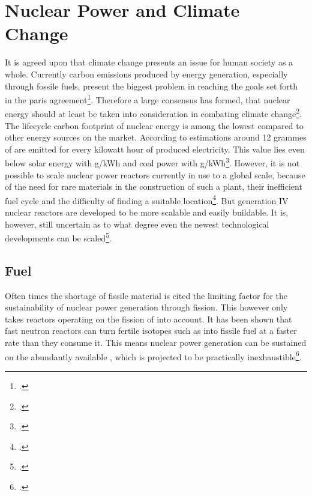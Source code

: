 \chapter{Nuclear Power and Climate Change}
It is agreed upon that climate change presents an issue for human society as a whole. Currently
carbon emissions produced by energy generation, especially through fossile fuels,
present the biggest problem in reaching the goals set forth in the paris agreement\footcite{paris}.
Therefore a large consensus has formed, that nuclear energy should at least be taken into consideration
in combating climate change\footcite{nucandclim}.
The lifecycle carbon footprint of nuclear energy is among the lowest compared to other energy
sources on the market. According to estimations around 12 grammes of  are emitted for
every kilowatt hour of produced electricity. This value lies even below solar energy with \unit[40]{g/kWh}
and coal power with \unit[820]{g/kWh}\footcite{ipcc}. However, it is not possible to scale
nuclear power reactors currently in use to a global scale, because of the need for rare materials
in the construction of such a plant, their inefficient fuel cycle and the difficulty of finding a
suitable location\footcite{scale}. But generation IV nuclear reactors are developed to be more
scalable and easily buildable. It is, however, still uncertain as to what degree even the newest
technological developments can be scaled\footcite{GIFAR}.
\section{Fuel}
Often times the shortage of fissile material is cited the limiting factor for the sustainability of
nuclear power generation through fission. This however only takes reactors operating on the fission
of  into account. It has been shown that fast neutron reactors can turn fertile isotopes
such as  into fissile fuel at a faster rate than they consume it. This means nuclear
power generation can be sustained on the abundantly available , which is projected to
be practically inexhaustible\footcite{inex}.
